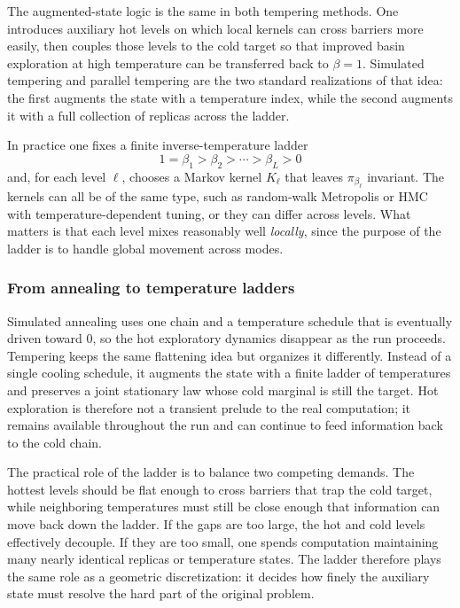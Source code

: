 The augmented-state logic is the same in both tempering methods.
One introduces auxiliary hot levels on which local kernels can cross barriers more easily, then couples those levels to the cold target so that improved basin exploration at high temperature can be transferred back to $\beta=1$.
Simulated tempering and parallel tempering are the two standard realizations of that idea: the first augments the state with a temperature index, while the second augments it with a full collection of replicas across the ladder.

In practice one fixes a finite inverse-temperature ladder
\begin{equation}
  1=\beta_1 > \beta_2 > \cdots > \beta_L > 0
  \label{eq:tempering-ladder}
\end{equation}
and, for each level $\ell$, chooses a Markov kernel $K_\ell$ that leaves $\pi_{\beta_\ell}$ invariant.
The kernels can all be of the same type, such as random-walk Metropolis or HMC with temperature-dependent tuning, or they can differ across levels.
What matters is that each level mixes reasonably well \emph{locally}, since the purpose of the ladder is to handle global movement across modes.

\subsubsection{From annealing to temperature ladders}
\label{subsubsec:tempering-ladders}

Simulated annealing uses one chain and a temperature schedule that is eventually driven toward $0$, so the hot exploratory dynamics disappear as the run proceeds.
Tempering keeps the same flattening idea but organizes it differently.
Instead of a single cooling schedule, it augments the state with a finite ladder of temperatures and preserves a joint stationary law whose cold marginal is still the target.
Hot exploration is therefore not a transient prelude to the real computation; it remains available throughout the run and can continue to feed information back to the cold chain.

The practical role of the ladder is to balance two competing demands.
The hottest levels should be flat enough to cross barriers that trap the cold target, while neighboring temperatures must still be close enough that information can move back down the ladder.
If the gaps are too large, the hot and cold levels effectively decouple.
If they are too small, one spends computation maintaining many nearly identical replicas or temperature states.
The ladder therefore plays the same role as a geometric discretization: it decides how finely the auxiliary state must resolve the hard part of the original problem.

